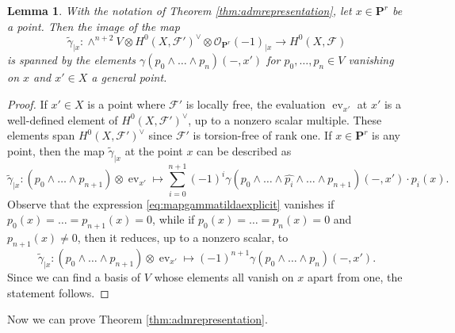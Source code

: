 \documentclass[12pt]{amsart}
\newcounter{thmcounter}
\numberwithin{equation}{section}
\numberwithin{thmcounter}{section}
\newtheorem{lemma}[thmcounter]{Lemma}
\theoremstyle{definition}
\theoremstyle{claim}
\newcommand{\nP}{\mathbf{P}}
\newcommand{\sF}{\mathscr{F}}
\newcommand{\sO}{\mathscr{O}}
\begin{document}
\begin{lemma}\label{lem:imagegammatilda}
With the notation of Theorem \ref{thm:admrepresentation}, let $x\in \nP^r$ be a point. Then the image of the map
	\begin{equation*}
	\widetilde{\gamma}_{|x}\colon \wedge^{n+2}V\otimes H^0(X,\sF')^{\vee} \otimes \sO_{\nP^r}(-1)_{|x} \longrightarrow H^0(X,\sF)
\end{equation*}
is spanned by the elements $\gamma(p_0\wedge \dots \wedge p_n)(-,x')$ for $p_0,\dots,p_n\in V$ vanishing on $x$ and $x'\in X$ a general point.
\end{lemma}
\begin{proof}
	If $x'\in X$ is a point where $\sF'$ is locally free, the evaluation $\operatorname{ev}_{x'}$  at $x'$ is a well-defined element of $H^0(X,\sF')^{\vee}$, up to a nonzero scalar multiple. These elements span $H^0(X,\sF')^{\vee}$ since $\sF'$ is torsion-free of rank one. If $x\in \nP^r$ is any point, then the map $\widetilde{\gamma}_{|x}$ at the point $x$ can be described as
	\begin{equation}\label{eq:mapgammatildaexplicit}
	\widetilde{\gamma}_{|x}\colon  \left( p_0\wedge \dots \wedge p_{n+1} \right) \otimes \operatorname{ev}_{x'} \longmapsto \sum_{i=0}^{n+1}(-1)^i \gamma(p_0 \wedge \dots \wedge \hat{p_i} \wedge \dots \wedge p_{n+1})(-,x') \cdot p_i(x).
	\end{equation}
  Observe that the expression \eqref{eq:mapgammatildaexplicit} vanishes if $p_0(x) = \dots = p_{n+1}(x)=0$, while if $p_0(x)=\dots=p_{n}(x)=0$ and $p_{n+1}(x)\ne 0$, then it reduces, up to a nonzero scalar,  to
	\begin{equation}\label{eq:mapgammatildaexplicit2}
		\widetilde{\gamma}_{|x}\colon  \left( p_0\wedge \dots \wedge p_{n+1} \right) \otimes \operatorname{ev}_{x'} \longmapsto (-1)^{n+1} \gamma(p_0 \wedge \dots \wedge p_{n})(-,x').
	\end{equation}
Since we can find a basis of $V$ whose  elements all vanish on $x$ apart from one, the statement follows.
\end{proof}

Now we can prove Theorem \ref{thm:admrepresentation}.
\end{document}
